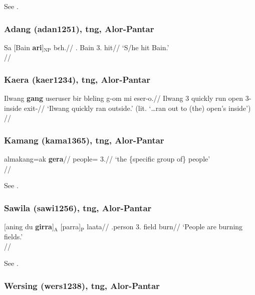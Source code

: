 \documentclass[A4paper]{article}
\newcommand{\unt}[1]{\hbox{}$_\text{#1}$}
\begin{document}
See \citet[53f., 167, 190f., 353]{reesink1987}.


\subsubsection{Adang (adan1251), \gls{tng}, Alor-Pantar}

\ex 
\begingl
\gla Sa [Bain \textbf{\textglotstop{}ari}]\unt{NP} b$\epsilon$h.//
\Sg.\Sbj{} Bain 3.\Obj{} hit//
\glft `S/he hit Bain.'\\\citep[261, (165)]{robinsonhaan2014}//
\endgl
\xe

\subsubsection{Kaera (kaer1234), \gls{tng}, Alor-Pantar}

\ex 
\begingl
\gla Ilwang \textbf{gang} user\texttildelow{}user bir bleling g-om mi eser-o.//
\glb Ilwang 3\Sg{} \Redup\texttildelow{}quickly run open 3\Sg{}-inside \Loc{} exit-\Fin{}//
\glft `Ilwang quickly ran outside.' (lit. `\ldots ran out to (the) open's inside')\\\citep[129, (98)]{klamer2014}//
\endgl
\xe

\newpage

\subsubsection{Kamang (kama1365), \gls{tng}, Alor-Pantar}

\ex
\begingl 
\gla almakang=ak \textbf{gera}//
\glb people=\Def{} 3.\Contr{}//
\glft `the \{specific group of\} people'\\{\citep[313f., (58a)]{schapper2014}}//
\endgl
\xe

See \citet[313f.]{schapper2014}.

\subsubsection{Sawila (sawi1256), \gls{tng}, Alor-Pantar}

\ex \begingl
\gla {}[aning du \textbf{girra}]\unt{A} [parra]\unt{P} laata//
\glb \Nfin.person \Pl{} 3.\Aarg{} field burn//
\glft `People are burning fields.'\\ \citep[392, (102f)]{kratochvil2014}//
\endgl
\xe

See \citealp[391f.]{kratochvil2014}.
 
\subsubsection{Wersing (wers1238), \gls{tng}, Alor-Pantar}
\end{document}
